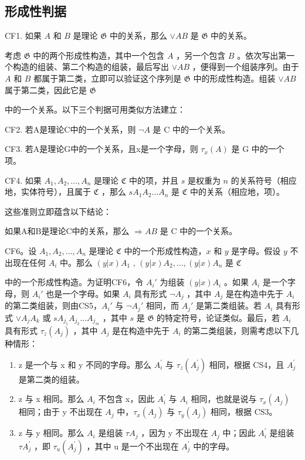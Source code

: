 \subsection{形成性判据}

CF1. 如果 \(A\) 和 \(B\) 是理论 \(\mathfrak{G}\) 中的关系，那么 \(\vee AB\) 是 \(\mathfrak{G}\) 中的关系。

考虑 \(\mathfrak{G}\) 中的两个形成性构造，其中一个包含 \(A\) ，另一个包含 \(B\) 。依次写出第一个构造的组装、第二个构造的组装，最后写出 \(\vee AB\) ，便得到一个组装序列。由于 \(A\) 和 \(B\) 都属于第二类，立即可以验证这个序列是 \(\mathfrak{G}\) 中的形成性构造。组装 \(\vee AB\) 属于第二类，因此它是 \(\mathfrak{G}\)

中的一个关系。以下三个判据可用类似方法建立：

CF2. 若A是理论C中的一个关系，则 \(\neg A\) 是 C 中的一个关系。

CF3. 若A是理论G中的一个关系，且x是一个字母，则 \(\tau_{x}(A)\) 是 G 中的一个项。

CF4. 如果 \(A_1, A_2, \ldots, A_n\) 是理论 \(\mathfrak{C}\) 中的项，并且 \(s\) 是权重为 \(n\) 的关系符号（相应地，实体符号），且属于 \(\mathfrak{C}\) ，那么 \(sA_1A_2\ldots A_n\) 是 \(\mathfrak{C}\) 中的关系（相应地，项）。

这些准则立即蕴含以下结论：

如果A和B是理论C中的关系，那么 \(\Longrightarrow AB\) 是 C 中的一个关系。

CF6。设 \(A_1, A_2, \ldots, A_n\) 是理论 \(\mathfrak{C}\) 中的一个形成性构造，\(x\) 和 \(y\) 是字母。假设 \(y\) 不出现在任何 \(A_i\) 中。那么 \((y|x)A_1\) , \((y|x)A_2, \ldots, (y|x)A_n\) 是 \(\mathfrak{C}\)

中的一个形成性构造。为证明CF6，令 \(A_i'\) 为组装 \((y|x)A_i\) 。如果 \(A_i\) 是一个字母，则 \(A_i'\) 也是一个字母。如果 \(A_i\) 具有形式 \(\neg A_j\) ，其中 \(A_j\) 是在构造中先于 \(A_i\) 的第二类组装，则由CS5，\(A_i'\) 与 \(\neg A_j'\) 相同，而 \(A_j'\) 是第二类组装。若 \(A_i\) 具有形式 \(\vee A_jA_k\) 或 \(sA_{j_1}A_{j_2}\ldots A_{j_m}\) ，其中 \(s\) 是 \(\mathfrak{G}\) 的特定符号，论证类似。最后，若 \(A_i\) 具有形式 \(\tau_z(A_j)\) ，其中 \(A_j\) 是在构造中先于 \(A_i\) 的第二类组装，则需考虑以下几种情形：

\begin{enumerate}
\def\labelenumi{(\alph{enumi})}
\item
  z 是一个与 x 和 y 不同的字母。那么 \(A_{i}^{\prime}\) 与 \(\tau_{z}(A_{j}^{\prime})\) 相同，根据 CS4，且 \(A_{j}^{\prime}\) 是第二类的组装。
\item
  z 与 x 相同。那么 \(A_{i}\) 不包含 x，因此 \(A_{i}^{\prime}\) 与 \(A_{i}\) 相同，也就是说与 \(\tau_{x}(A_{j})\) 相同；由于 y 不出现在 \(A_{j}\) 中，\(\tau_{x}(A_{j})\) 与 \(\tau_{y}(A_{j})\) 相同，根据 CS3。
\item
  z 与 y 相同。那么 \(A_{i}\) 是组装 \(\tau A_{j}\) ，因为 y 不出现在 \(A_{j}\) 中；因此 \(A_{i}^{\prime}\) 是组装 \(\tau A_{j}^{\prime}\) ，即 \(\tau_{u}(A_{j}^{\prime})\) ，其中 u 是一个不出现在 \(A_{j}^{\prime}\) 中的字母。
\end{enumerate}

